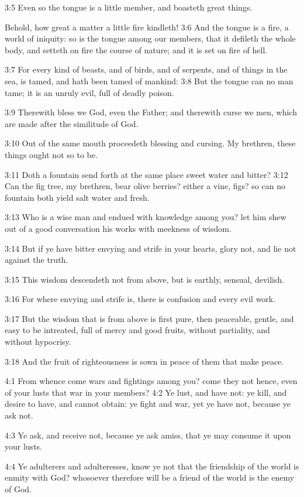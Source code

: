 3:5 Even so the tongue is a little member, and boasteth great things.

Behold, how great a matter a little fire kindleth!  3:6 And the tongue is a fire, a world of iniquity: so is the tongue among our members, that it defileth the whole body, and setteth on fire the course of nature; and it is set on fire of hell.

3:7 For every kind of beasts, and of birds, and of serpents, and of things in the sea, is tamed, and hath been tamed of mankind: 3:8 But the tongue can no man tame; it is an unruly evil, full of deadly poison.

3:9 Therewith bless we God, even the Father; and therewith curse we men, which are made after the similitude of God.

3:10 Out of the same mouth proceedeth blessing and cursing. My brethren, these things ought not so to be.

3:11 Doth a fountain send forth at the same place sweet water and bitter?  3:12 Can the fig tree, my brethren, bear olive berries?  either a vine, figs? so can no fountain both yield salt water and fresh.

3:13 Who is a wise man and endued with knowledge among you? let him shew out of a good conversation his works with meekness of wisdom.

3:14 But if ye have bitter envying and strife in your hearts, glory not, and lie not against the truth.

3:15 This wisdom descendeth not from above, but is earthly, sensual, devilish.

3:16 For where envying and strife is, there is confusion and every evil work.

3:17 But the wisdom that is from above is first pure, then peaceable, gentle, and easy to be intreated, full of mercy and good fruits, without partiality, and without hypocrisy.

3:18 And the fruit of righteousness is sown in peace of them that make peace.

4:1 From whence come wars and fightings among you? come they not hence, even of your lusts that war in your members?  4:2 Ye lust, and have not: ye kill, and desire to have, and cannot obtain: ye fight and war, yet ye have not, because ye ask not.

4:3 Ye ask, and receive not, because ye ask amiss, that ye may consume it upon your lusts.

4:4 Ye adulterers and adulteresses, know ye not that the friendship of the world is enmity with God? whosoever therefore will be a friend of the world is the enemy of God.

